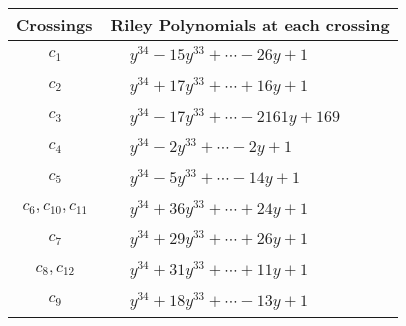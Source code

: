 \documentclass[1p]{elsarticle_modified}
\theoremstyle{definition}
\begin{document}
\begin{tabular}{m{50pt}|m{274pt}}
Crossings & \hspace{64pt}Riley Polynomials at each crossing \\
\hline $$\begin{aligned}c_{1}\end{aligned}$$&$\begin{aligned}
&y^{34}-15 y^{33}+\cdots-26 y+1
\end{aligned}$\\
\hline $$\begin{aligned}c_{2}\end{aligned}$$&$\begin{aligned}
&y^{34}+17 y^{33}+\cdots+16 y+1
\end{aligned}$\\
\hline $$\begin{aligned}c_{3}\end{aligned}$$&$\begin{aligned}
&y^{34}-17 y^{33}+\cdots-2161 y+169
\end{aligned}$\\
\hline $$\begin{aligned}c_{4}\end{aligned}$$&$\begin{aligned}
&y^{34}-2 y^{33}+\cdots-2 y+1
\end{aligned}$\\
\hline $$\begin{aligned}c_{5}\end{aligned}$$&$\begin{aligned}
&y^{34}-5 y^{33}+\cdots-14 y+1
\end{aligned}$\\
\hline $$\begin{aligned}c_{6},c_{10},c_{11}\end{aligned}$$&$\begin{aligned}
&y^{34}+36 y^{33}+\cdots+24 y+1
\end{aligned}$\\
\hline $$\begin{aligned}c_{7}\end{aligned}$$&$\begin{aligned}
&y^{34}+29 y^{33}+\cdots+26 y+1
\end{aligned}$\\
\hline $$\begin{aligned}c_{8},c_{12}\end{aligned}$$&$\begin{aligned}
&y^{34}+31 y^{33}+\cdots+11 y+1
\end{aligned}$\\
\hline $$\begin{aligned}c_{9}\end{aligned}$$&$\begin{aligned}
&y^{34}+18 y^{33}+\cdots-13 y+1
\end{aligned}$\\
\hline
\end{tabular}\\~\\
\end{document}
